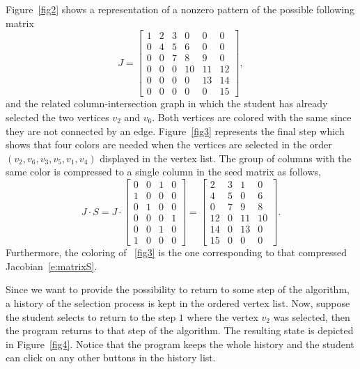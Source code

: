 \documentclass[12pt, twoside,a4paper,toc=bibliography]{scrbook}
\newcommand{\figref}[1]{Figure~\protect\ref{#1}}
\begin{document}
\figref{fig2} shows a representation of a nonzero pattern of the possible following matrix
\begin{equation}
\label{e:matrixJ}
J =
\begin{bmatrix}
1 & 2 & 3 & 0 & 0 & 0 \\
0 & 4 & 5 & 6 & 0 & 0 \\
0 & 0 & 7 & 8 & 9 & 0\\
0 & 0 & 0 & 10 & 11 & 12\\
0 & 0 & 0 & 0 & 13 & 14 \\
0 & 0 & 0 & 0 & 0 & 15
\end{bmatrix},
\end{equation}
and the related column-intersection graph in which the student has already selected the two vertices $v_2$ and $v_6$. Both vertices are colored with the same since they are not connected by an edge. \figref{fig3} represents the final step which shows that four colors are needed when the vertices are selected in the order $(v_2, v_6, v_3, v_5, v_1, v_4)$ displayed in the vertex list. The group of columns with the same color is compressed to a single column in the seed matrix as follows,
\begin{equation}
\label{e:matrixS}
J \cdot S =
J \cdot
\begin{bmatrix}
 0  & 0 & 1 & 0 \\
 1  & 0 & 0 & 0 \\
 0  & 1 & 0 & 0 \\
 0  & 0 & 0 & 1 \\
 0  & 0 & 1 & 0 \\
 1  & 0 & 0 & 0
\end{bmatrix}
=
\begin{bmatrix}
2 & 3 & 1 & 0 \\
4 & 5 & 0 & 6 \\
0 & 7 & 9 & 8 \\
12 & 0 & 11 & 10\\
14 & 0 & 13 & 0 \\
15 & 0 & 0 & 0
\end{bmatrix}.
\end{equation}
Furthermore, the coloring of \figurename~\ref{fig3} is the one corresponding to that compressed Jacobian~\eqref{e:matrixS}.

Since we want to provide the possibility to return to some step of the algorithm, a history of the selection process is kept in the ordered vertex list. Now, suppose the student selects to return to the step $1$ where the vertex $v_2$ was selected, then the program returns to that step of the algorithm. The resulting state is depicted in \figref{fig4}. Notice that the program keeps the whole history and the student can click on any other buttons in the history list.
\end{document}
